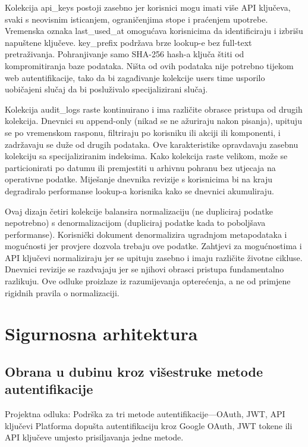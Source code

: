 \documentclass[12pt,a4paper]{article}
\begin{document}
Kolekcija api\_keys postoji zasebno jer korisnici mogu imati više API ključeva, svaki s neovisnim isticanjem, ograničenjima stope i praćenjem upotrebe. Vremenska oznaka last\_used\_at omogućava korisnicima da identificiraju i izbrišu napuštene ključeve. key\_prefix podržava brze lookup-e bez full-text pretraživanja. Pohranjivanje samo SHA-256 hash-a ključa štiti od kompromitiranja baze podataka. Ništa od ovih podataka nije potrebno tijekom web autentifikacije, tako da bi zagađivanje kolekcije users time usporilo uobičajeni slučaj da bi posluživalo specijalizirani slučaj.

Kolekcija audit\_logs raste kontinuirano i ima različite obrasce pristupa od drugih kolekcija. Dnevnici su append-only (nikad se ne ažuriraju nakon pisanja), upituju se po vremenskom rasponu, filtriraju po korisniku ili akciji ili komponenti, i zadržavaju se duže od drugih podataka. Ove karakteristike opravdavaju zasebnu kolekciju sa specijaliziranim indeksima. Kako kolekcija raste velikom, može se particionirati po datumu ili premjestiti u arhivnu pohranu bez utjecaja na operativne podatke. Miješanje dnevnika revizije s korisnicima bi na kraju degradiralo performanse lookup-a korisnika kako se dnevnici akumuliraju.

Ovaj dizajn četiri kolekcije balansira normalizaciju (ne dupliciraj podatke nepotrebno) s denormalizacijom (dupliciraj podatke kada to poboljšava performanse). Korisnički dokument denormalizira ugradnjom metapodataka i mogućnosti jer provjere dozvola trebaju ove podatke. Zahtjevi za mogućnostima i API ključevi normaliziraju jer se upituju zasebno i imaju različite životne cikluse. Dnevnici revizije se razdvajaju jer se njihovi obrasci pristupa fundamentalno razlikuju. Ove odluke proizlaze iz razumijevanja opterećenja, a ne od primjene rigidnih pravila o normalizaciji.

\section{Sigurnosna arhitektura}

\subsection{Obrana u dubinu kroz višestruke metode autentifikacije}

\begin{rationale}{Projektna odluka: Podrška za tri metode autentifikacije—OAuth, JWT, API ključevi}
Platforma dopušta autentifikaciju kroz Google OAuth, JWT tokene ili API ključeve umjesto prisiljavanja jedne metode.
\end{rationale}
\end{document}
